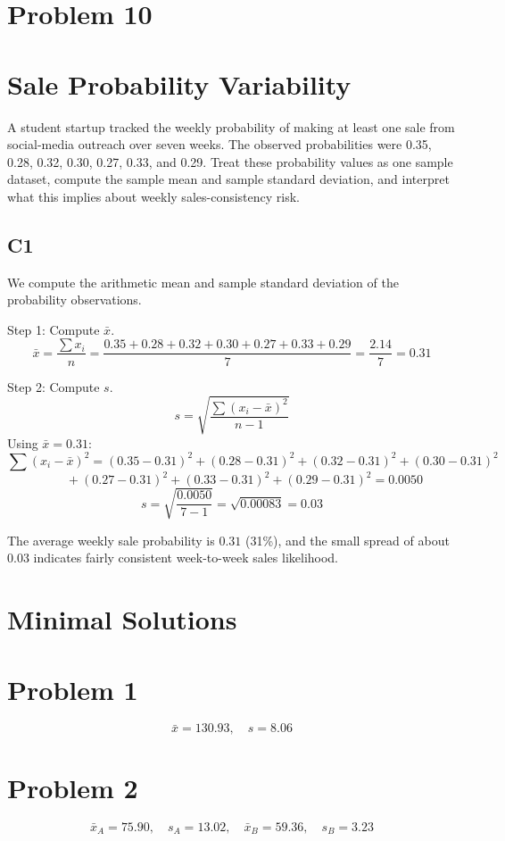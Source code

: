 \begin{ExamProblems}
		\newpage
		\item
		\section{Problem 10}
		\section{Sale Probability Variability}
		A student startup tracked the weekly probability of making at least one sale from social-media outreach over seven weeks. The observed probabilities were 0.35, 0.28, 0.32, 0.30, 0.27, 0.33, and 0.29. Treat these probability values as one sample dataset, compute the sample mean and sample standard deviation, and interpret what this implies about weekly sales-consistency risk.

		\subsection*{C1}
		We compute the arithmetic mean and sample standard deviation of the probability observations.

		Step 1: Compute $\bar{x}$.
		\[
		\bar{x} = \frac{\sum x_i}{n}
		= \frac{0.35+0.28+0.32+0.30+0.27+0.33+0.29}{7}
		= \frac{2.14}{7}
		= 0.31
		\]

		Step 2: Compute $s$.
		\[
		s = \sqrt{\frac{\sum (x_i-\bar{x})^2}{n-1}}
		\]
		Using $\bar{x}=0.31$:
		\[
		\sum (x_i-\bar{x})^2 = (0.35-0.31)^2+(0.28-0.31)^2+(0.32-0.31)^2+(0.30-0.31)^2
		\]
		\[
		\qquad +(0.27-0.31)^2+(0.33-0.31)^2+(0.29-0.31)^2 = 0.0050
		\]
		\[
		s = \sqrt{\frac{0.0050}{7-1}} = \sqrt{0.00083} = 0.03
		\]

		The average weekly sale probability is $0.31$ (31\%), and the small spread of about $0.03$ indicates fairly consistent week-to-week sales likelihood.

	\end{ExamProblems}

\section{Minimal Solutions}
\section{Problem 1}
\[
\bar{x}=130.93,\quad s=8.06
\]

\section{Problem 2}
\[
\bar{x}_A=75.90,\quad s_A=13.02,\quad \bar{x}_B=59.36,\quad s_B=3.23
\]

